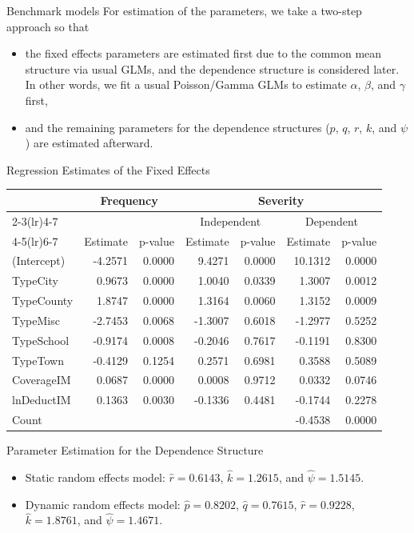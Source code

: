 \documentclass[ignorenonframetext,]{beamer}
\begin{document}
\begin{frame}{Benchmark models}
For estimation of the parameters, we take a two-step approach so that
\begin{itemize}
\item the fixed effects parameters are estimated first due to the common mean structure via usual GLMs, and the dependence structure is considered later.
In other words, we fit a usual Poisson/Gamma GLMs to estimate $\alpha$, $\beta$, and $\gamma$ first,
\item and the remaining parameters for the dependence structures ($p$, $q$, $r$, $k$, and $\psi$) are estimated afterward.
\end{itemize}
\end{frame}

\begin{frame}{Regression Estimates of the Fixed Effects}
\centering
\scriptsize
\begin{tabular}{lrrrrrr}
\toprule
 & \multicolumn{2}{c}{Frequency} & \multicolumn{4}{c}{Severity} \\
\cmidrule(lr){2-3}\cmidrule(lr){4-7}
 & & & \multicolumn{2}{c}{Independent} & \multicolumn{2}{c}{Dependent} \\
\cmidrule(lr){4-5}\cmidrule(lr){6-7}
 & Estimate & p-value & Estimate & p-value & Estimate & p-value \\
\midrule
(Intercept) & -4.2571 & 0.0000 & 9.4271 & 0.0000 & 10.1312 & 0.0000 \\
TypeCity & 0.9673 & 0.0000 & 1.0040 & 0.0339 & 1.3007 & 0.0012 \\
TypeCounty & 1.8747 & 0.0000 & 1.3164 & 0.0060 & 1.3152 & 0.0009 \\
TypeMisc & -2.7453 & 0.0068 & -1.3007 & 0.6018 & -1.2977 & 0.5252 \\
TypeSchool & -0.9174 & 0.0008 & -0.2046 & 0.7617 & -0.1191 & 0.8300 \\
TypeTown & -0.4129 & 0.1254 & 0.2571 & 0.6981 & 0.3588 & 0.5089 \\
CoverageIM & 0.0687 & 0.0000 & 0.0008 & 0.9712 & 0.0332 & 0.0746 \\
lnDeductIM & 0.1363 & 0.0030 & -0.1336 & 0.4481 & -0.1744 & 0.2278 \\
Count & & & & & -0.4538 & 0.0000 \\
\hline\hline
\end{tabular}
\end{frame}

\begin{frame}{Parameter Estimation for the Dependence Structure}
\begin{itemize}
\item Static random effects model: $\hat{r}=0.6143$, $\hat{k}=1.2615$, and $\hat{\psi}=1.5145$.
\item Dynamic random effects model: $\hat{p}=0.8202$, $\hat{q}=0.7615$, $\hat{r}=0.9228$, $\hat{k}=1.8761$, and $\hat{\psi}=1.4671$.
\end{itemize}
\end{frame}
\end{document}
